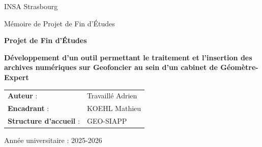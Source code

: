 \begin{titlepage}
  \centering
  {\Large INSA Strasbourg \par}
  \vspace{0.5cm}
  {\large Mémoire de Projet de Fin d'Études \par}

  \vspace{1.5cm}
  {\Huge \bfseries Projet de Fin d'Études \par}
  \vspace{0.8cm}
  {\Large \bfseries Développement d'un outil permettant le traitement et l'insertion des archives numériques sur Geofoncier au sein d'un cabinet de Géomètre-Expert\par}
  \vspace{0.2cm}
  {\Large \bfseries \par}

  \vspace{1.5cm}
  \begin{tabular}{ll}
    \textbf{Auteur} : & Travaillé Adrien \\
    \textbf{Encadrant} : & KOEHL Mathieu \\
    \textbf{Structure d'accueil} : & GEO-SIAPP \\
  \end{tabular}

  \vfill
  {\large Année universitaire : 2025-2026 \par}
\end{titlepage}

